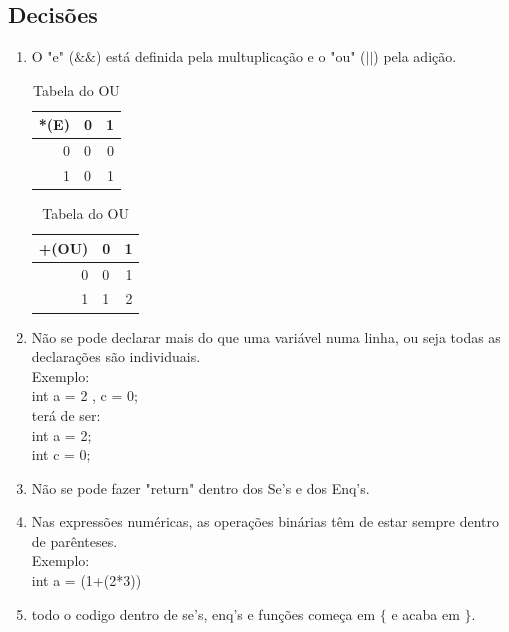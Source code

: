 \documentclass{report}
\begin{document}
\subsection{Decisões}
\begin{enumerate}[1)]
	\item O "e" ($\&\&$) está definida pela multuplicação e o "ou" ($||$) pela adição.
 
	 \begin{table}[h]
		\begin{center}
	 	\caption{Tabela do E}
	 	\begin{tabular}{r|lr}
	 	 *(E)& 0 & 1\\ %
	 	\hline          %
	 	0 & 0 & 0 \\
	 	1 & 0 & 1\\
 	
		\end{tabular}
		\caption{Tabela do OU}
		\begin{tabular}{r|lr}
		+(OU)& 0 & 1\\ %
		\hline          %
		0 & 0 & 1 \\
		1 & 1 & 2\\
		\end{tabular}
		\end{center}
	\end{table}

	\item Não se pode declarar mais do que uma variável numa linha, ou seja todas as declarações são individuais.\\
	 Exemplo: \\int a = 2 , c = 0;\\ terá de ser:\\
	 int a = 2;\\
	 int c = 0;\\
	 \item Não se pode fazer "return" dentro dos Se's e dos Enq's.\\ 
	 \item Nas expressões numéricas, as operações binárias têm de estar sempre dentro de parênteses.\\
	 Exemplo:\\
	 int a = (1+(2*3))
	 \item todo o codigo dentro de se's, enq's e funções começa em $\{$ e acaba em  $\}$.
	 
	
\end{enumerate}
\end{document}
